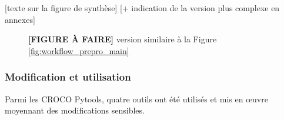 \documentclass[10pt,a4paper,titlepage]{article}
\begin{document}
    \alert{[texte sur la figure de synthèse]
        [+ indication de la version plus complexe en annexes]}
    \begin{figure}[h!]
        \centering
        \caption{
            \textbf{[FIGURE À FAIRE]}
            version similaire à la Figure \ref{fig:workflow_prepro_main}
        }
        \label{fig:workflow_prepro_original}
    \end{figure}
    
    
    \subsubsection{Modification et utilisation}
    
    Parmi les CROCO Pytools, quatre outils ont été utilisés et mis en \oe{uvre} moyennant des modifications sensibles.
    
\end{document}
